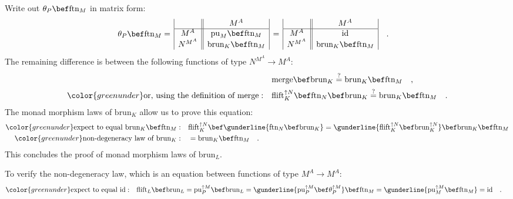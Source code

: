 Write out $\theta_{P}\bef\text{ftn}_{M}$ in matrix form:
\begin{align*}
 & \theta_{P}\bef\text{ftn}_{M}=\,\begin{array}{|c||c|}
 & M^{A}\\
\hline M^{A} & \text{pu}_{M}\bef\text{ftn}_{M}\\
N^{M^{A}} & \text{brun}_{K}\bef\text{ftn}_{M}
\end{array}\,=\,\begin{array}{|c||c|}
 & M^{A}\\
\hline M^{A} & \text{id}\\
N^{M^{A}} & \text{brun}_{K}\bef\text{ftn}_{M}
\end{array}\quad.
\end{align*}
The remaining difference is between the following functions of type
$N^{M^{A}}\rightarrow M^{A}$:
\begin{align*}
 & \text{merge}\bef\text{brun}_{K}\overset{?}{=}\text{brun}_{K}\bef\text{ftn}_{M}\quad,\\
{\color{greenunder}\text{or, using the definition of }\text{merge}:}\quad & \text{flift}_{K}^{\uparrow N}\bef\text{ftn}_{N}\bef\text{brun}_{K}\overset{?}{=}\text{brun}_{K}\bef\text{ftn}_{M}\quad.
\end{align*}
The monad morphism laws of $\text{brun}_{K}$ allow us to prove this
equation:
\begin{align*}
{\color{greenunder}\text{expect to equal }\text{brun}_{K}\bef\text{ftn}_{M}:}\quad & \text{flift}_{K}^{\uparrow N}\bef\gunderline{\text{ftn}_{N}\bef\text{brun}_{K}}=\gunderline{\text{flift}_{K}^{\uparrow N}\bef\text{brun}_{K}^{\uparrow N}}\bef\text{brun}_{K}\bef\text{ftn}_{M}\\
{\color{greenunder}\text{non-degeneracy law of }\text{brun}_{K}:}\quad & =\text{brun}_{K}\bef\text{ftn}_{M}\quad.
\end{align*}
This concludes the proof of monad morphism laws of $\text{brun}_{L}$.

To verify the non-degeneracy law, which is an equation between functions
of type $M^{A}\rightarrow M^{A}$:
\begin{align*}
{\color{greenunder}\text{expect to equal }\text{id}:}\quad & \text{flift}_{L}\bef\text{brun}_{L}=\text{pu}_{P}^{\uparrow M}\bef\text{brun}_{L}=\gunderline{\text{pu}_{P}^{\uparrow M}\bef\theta_{P}^{\uparrow M}}\bef\text{ftn}_{M}=\gunderline{\text{pu}_{M}^{\uparrow M}\bef\text{ftn}_{M}}=\text{id}\quad.
\end{align*}


